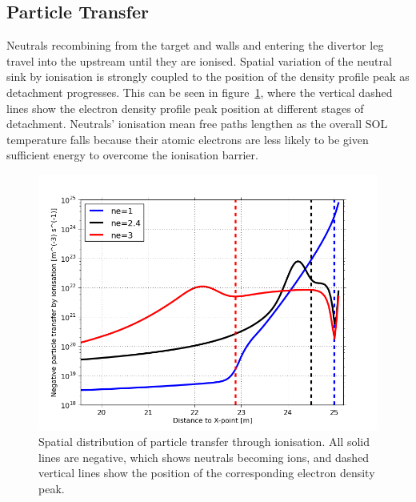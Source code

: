 \documentclass[12pt]{article}  %
\begin{document}
\subsection{Particle Transfer}\label{ssecPtrans}
Neutrals recombining from the target and walls and entering the divertor leg travel into the upstream until they are ionised. Spatial variation of the neutral sink by ionisation is strongly coupled to the position of the density profile peak as detachment progresses. This can be seen in figure~\ref{figbalSizthick20m}, where the vertical dashed lines show the electron density profile peak position at different stages of detachment. Neutrals' ionisation mean free paths lengthen as the overall SOL temperature falls because their atomic electrons are less likely to be given sufficient energy to overcome the ionisation barrier.

\begin{figure}
\includegraphics[scale=0.7]{Figures/sol1d/balSizthick20m.png}
\centering
\caption{Spatial distribution of particle transfer through ionisation. All solid lines are negative, which shows neutrals becoming ions, and dashed vertical lines show the position of the corresponding electron density peak.}\label{figbalSizthick20m}
\end{figure}
\end{document}
